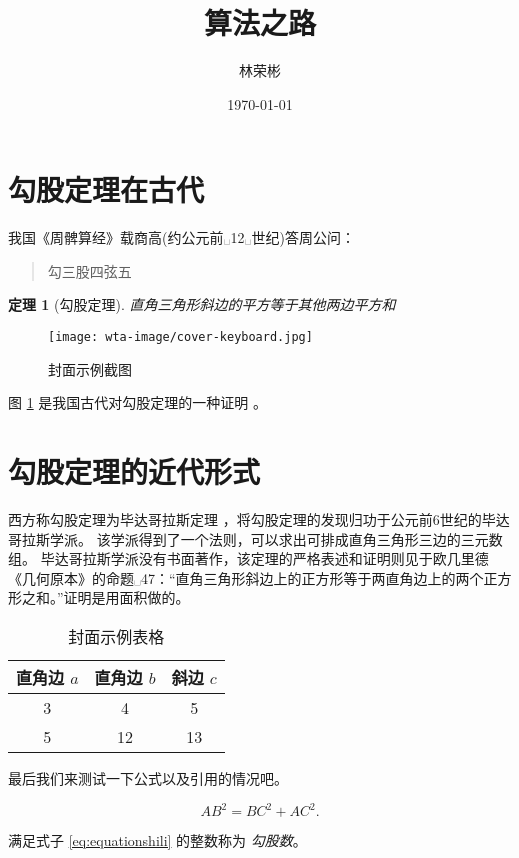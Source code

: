 \documentclass[a4paper,UTF8]{ctexart}
\title{算法之路}
\author{林荣彬}
\date{\today}
\newtheorem{theorem}{定理}
\begin{document}
\maketitle
\tableofcontents
\section{勾股定理在古代}

我国《周髀算经》载商高(约公元前␣12␣世纪)答周公问：
\begin{quote}
    勾三股四弦五
\end{quote}

\begin{theorem}[勾股定理]
    直角三角形斜边的平方等于其他两边平方和
\end{theorem}

\begin{figure}[ht]
    \centering
    \texttt{[image: wta-image/cover-keyboard.jpg]}
    \caption{封面示例截图}
    \label{fig:jietushili}
\end{figure}

图 \ref{fig:jietushili} 是我国古代对勾股定理的一种证明 \cite{IntroductionToAlgorithms} 。

\section{勾股定理的近代形式}

西方称勾股定理为毕达哥拉斯定理 \cite{IntroductionToAlgorithms}，将勾股定理的发现归功于公元前6世纪的毕达哥拉斯学派。
该学派得到了一个法则，可以求出可排成直角三角形三边的三元数组。
毕达哥拉斯学派没有书面著作，该定理的严格表述和证明则见于欧几里德《几何原本》的命题␣47：``直角三角形斜边上的正方形等于两直角边上的两个正方形之和。''证明是用面积做的。

\begin{table}[H]
    \centering
    \begin{tabular}{|ccc|}
        \hline
        直角边 $a$  &  直角边 $b$  &  斜边 $c$  \\
        \hline
        3 & 4 & 5   \\
        5 & 12 & 13 \\
        \hline
    \end{tabular}
    \caption{封面示例表格}
\end{table}

最后我们来测试一下公式以及引用的情况吧。

\begin{equation}
    \label{eq:equationshili}
    AB^2 = BC^2 + AC^2.
\end{equation}

满足式子 \eqref{eq:equationshili} 的整数称为 \emph{勾股数}。


\end{document}
